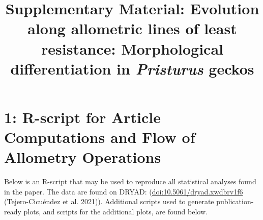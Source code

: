 \documentclass[
  11pt,
]{article}
\title{Supplementary Material: Evolution along allometric lines of least
resistance: Morphological differentiation in \emph{Pristurus} geckos}
\author{}
\date{\vspace{-2.5em}}
\begin{document}
\maketitle

\hypertarget{r-script-for-article-computations-and-flow-of-allometry-operations}{%
\section{1: R-script for Article Computations and Flow of Allometry
Operations}\label{r-script-for-article-computations-and-flow-of-allometry-operations}}

Below is an R-script that may be used to reproduce all statistical
analyses found in the paper. The data are found on DRYAD:
(\url{doi:10.5061/dryad.xwdbrv1f6} (Tejero-Cicuéndez et al. 2021)).
Additional scripts used to generate publication-ready plots, and scripts
for the additional plots, are found below.
\end{document}
